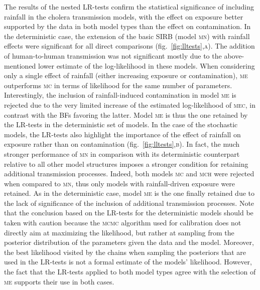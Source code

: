The results of the nested LR-tests confirm the statistical significance of including rainfall in the cholera transmission models, with the effect on exposure better supported by the data in both model types than the effect on contamination. In the deterministic case, the extension of the basic SIRB (model \textsc{mn}) with rainfall effects were significant for all direct comparisons (fig.~\ref{fig:lltests},\textsc{a}). The addition of human-to-human transmission was not significant mostly due to the above-mentioned lower estimate of the log-likelihood in these models. When considering only a single effect of rainfall (either increasing exposure or contamination), \textsc{me} outperforms \textsc{mc} in terms of likelihood for the same number of parameters. Interestingly, the inclusion of rainfall-induced contamination in model \textsc{me} is rejected due to the very limited increase of the estimated log-likelihood of \textsc{mec}, in contrast with the BFs favoring the latter. Model \textsc{me} is thus the one retained by the LR-tests in the deterministic set of models. In the case of the stochastic models, the LR-tests also highlight the importance of the effect of rainfall on exposure rather than on contamination (fig.~\ref{fig:lltests},\textsc{b}). In fact, the much stronger performance of \textsc{mn} in comparison with its deterministic counterpart relative to all other model structures imposes a stronger condition for retaining additional transmission processes. Indeed, both models \textsc{mc} and \textsc{mch} were rejected when compared to \textsc{mn}, thus only models with rainfall-driven exposure were retained. As in the deterministic case, model \textsc{me} is the one finally retained due to the lack of significance of the inclusion of additional transmission processes. Note that the conclusion based on the LR-tests for the deterministic models should be taken with caution because the \textsc{mcmc} algorithm used for calibration does not directly aim at maximizing the likelihood, but rather at sampling from the posterior distribution of the parameters given the data and the model. Moreover, the best likelihood visited by the chains when sampling the posteriors that are used in the LR-tests is not a formal estimate of the models' likelihood. However, the fact that the LR-tests applied to both model types agree with the selection of \textsc{me} supports their use in both cases.
